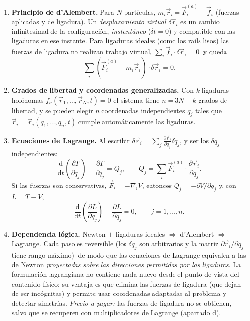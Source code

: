 \documentclass[11pt,a4paper]{article}
\newcommand{\dd}{\mathrm{d}}
\newcommand{\pd}[2]{\dfrac{\partial #1}{\partial #2}}
\newcommand{\ddt}[1]{\dfrac{\dd #1}{\dd t}}
\begin{document}
\begin{enumerate}[label=\roman*),leftmargin=*]
\item \textbf{Principio de d'Alembert.} Para $N$ partículas, $m_i\ddot{\vec r}_i=\vec F_i^{(a)}+\vec f_i$ (fuerzas aplicadas y de ligadura).
Un \emph{desplazamiento virtual} $\delta\vec r_i$ es un cambio infinitesimal de la configuración, \emph{instantáneo} ($\delta t=0$) y compatible con
las ligaduras en ese instante. Para ligaduras ideales (como los rails lisos) las fuerzas de ligadura no realizan trabajo virtual,
$\sum_i\vec f_i\cdot\delta\vec r_i=0$, y queda
\begin{equation}
 \sum_i\left(\vec F_i^{(a)}-m_i\ddot{\vec r}_i\right)\cdot\delta\vec r_i=0 .
\end{equation}
\item \textbf{Grados de libertad y coordenadas generalizadas.} Con $k$ ligaduras holónomas $f_\alpha(\vec r_1,\dots,\vec r_N,t)=0$ el sistema
tiene $n=3N-k$ grados de libertad, y se pueden elegir $n$ coordenadas independientes $q_j$ tales que $\vec r_i=\vec r_i(q_1,\dots,q_n,t)$ cumple automáticamente las ligaduras.
\item \textbf{Ecuaciones de Lagrange.} Al escribir $\delta\vec r_i=\sum_j\frac{\partial\vec r_i}{\partial q_j}\delta q_j$, y ser los $\delta q_j$ independientes:
\begin{equation}
 \ddt{}\!\left(\pd{T}{\dot q_j}\right)-\pd{T}{q_j}=Q_j,\qquad Q_j=\sum_i\vec F_i^{(a)}\cdot\pd{\vec r_i}{q_j}.
\end{equation}
Si las fuerzas son conservativas, $\vec F_i=-\nabla_iV$, entonces $Q_j=-\partial V/\partial q_j$ y, con $L=T-V$,
\begin{equation}
 \boxed{\ \ddt{}\!\left(\pd{L}{\dot q_j}\right)-\pd{L}{q_j}=0,\qquad j=1,\dots,n .\ }
\end{equation}
\item \textbf{Dependencia lógica.} Newton $+$ ligaduras ideales $\Rightarrow$ d'Alembert $\Rightarrow$ Lagrange. Cada paso es reversible
(los $\delta q_j$ son arbitrarios y la matriz $\partial\vec r_i/\partial q_j$ tiene rango máximo), de modo que las ecuaciones de Lagrange equivalen a las de Newton
\emph{proyectadas sobre las direcciones permitidas por las ligaduras}. La formulación lagrangiana no contiene nada nuevo desde el punto de vista del contenido físico:
su ventaja es que elimina las fuerzas de ligadura (que dejan de ser incógnitas) y permite usar coordenadas adaptadas al problema y detectar simetrías.
\emph{Precio a pagar:} las fuerzas de ligadura no se obtienen, salvo que se recuperen con multiplicadores de Lagrange (apartado d).
\end{enumerate}
\end{document}
